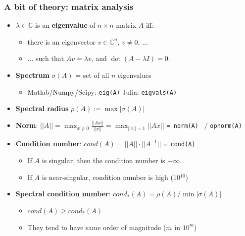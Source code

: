 \documentclass[bigger]{beamer}
\begin{document}
\begin{frame}%

\frametitle{A bit of theory: matrix analysis}

\begin{itemize}
\item $\lambda \in \mathbb{C}$ is an \textbf{eigenvalue} of $n\times n$
matrix $A$ iff:

\begin{itemize}
\item there is an eigenvector $v\in \mathbb{C}^{n}$, $v\neq 0$, ...

\item ... such that $Av=\lambda v$, and $\det (A-\lambda I)=0$.
\end{itemize}

\item \textbf{Spectrum} $\sigma (A)$ = set of all $n$ eigenvalues

\begin{itemize}
\item Matlab/Numpy/Scipy: \texttt{eig(A)} Julia: \texttt{eigvals(A)}
\end{itemize}

\item \textbf{Spectral radius} $\rho (A):=\max \left\vert \sigma
(A)\right\vert $

\item \textbf{Norm}: $||A||=\max_{x\neq 0}\frac{||Ax||}{||x||}%
=\max_{||x||=1}||Ax||$ \texttt{= norm(A) } / \texttt{opnorm(A) }

\item \textbf{Condition number}: $cond(A)=||A||\cdot ||A^{-1}||$ \texttt{=
cond(A)}

\begin{itemize}
\item If $A$ is singular, then the condition number is +$\infty $.

\item If $A$ is near-singular, condition number is high (\TEXTsymbol{>}10$%
^{10}$)
\end{itemize}

\item \textbf{Spectral condition number}: $cond_{\ast }(A)=\rho (A)/\min
\left\vert \sigma (A)\right\vert $

\begin{itemize}
\item $cond(A)\geq cond_{\ast }(A)$

\item They tend to have same order of magnitude ($m$ in $10^{m}$)
\end{itemize}
\end{itemize}


\end{frame}%
\end{document}
